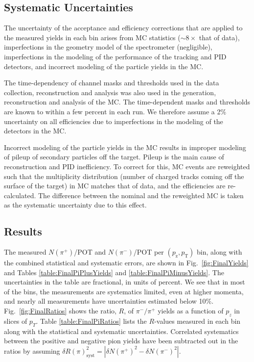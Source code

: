 \documentclass[%
aps, prd, reprint, show pacs, preprint numbers, ams math, amssymb, superscriptaddress, linenumbers]{revtex4-1}
\def\pzpt{$(p_\mathrm{z},p_\mathrm{T})$\xspace}
\begin{document}
\subsection{Systematic Uncertainties}

The uncertainty of the acceptance and efficiency corrections that are applied to the measured yields in each bin arises from MC statistics ($\sim 8\times$ that of data), imperfections in the geometry model of the spectrometer (negligible), imperfections in the modeling of the performance of the tracking and PID detectors, and incorrect modeling of the particle yields in the MC.  

The time-dependency of channel masks and thresholds used in the data collection, reconstruction and analysis was also used in the generation, reconstruction and analysis of the MC.  The time-dependent masks and thresholds are known to within a few percent in each run.  We therefore assume a 2\% uncertainty on all efficiencies due to imperfections in the modeling of the detectors in the MC.

Incorrect modeling of the particle yields in the MC results in improper modeling of pileup of secondary particles off the target.  Pileup is the main cause of reconstruction and PID inefficiency.  To correct for this, MC events are reweighted such that the multiplicity distribution (number of charged tracks coming off the surface of the target) in MC matches that of data, and the efficiencies are re-calculated.  The difference between the nominal and the reweighted MC is taken as the systematic uncertainty due to this effect.  

\subsection{Results}

The measured $N(\pi^+)$/POT and $N(\pi^-)$/POT per \pzpt bin, along with the combined statistical and systematic errors, are shown in Fig.~\ref{fig:FinalYields} and Tables \ref{table:FinalPiPlusYields} and \ref{table:FinalPiMinusYields}.  The uncertainties in the table are fractional, in units of percent.  We see that in most of the bins, the measurements are systematics limited, even at higher momenta, and nearly all measurements have uncertainties estimated below 10\%.  Fig.~\ref{fig:FinalRatios} shows the ratio, $R$, of
 $\pi^-/\pi^+$ yields as a function of $p_z$ in slices of $p_T$.  Table \ref{table:FinalPiRatios} lists the $R$-values measured in each bin along with the statistical and systematic uncertainties.  Correlated systematics between the positive and negative pion yields have been subtracted out in the ratios by assuming $\delta R(\pi)^2_\mathrm{syst} = |\delta N(\pi^+)^2 - \delta N(\pi^-)^2|$.
\end{document}
